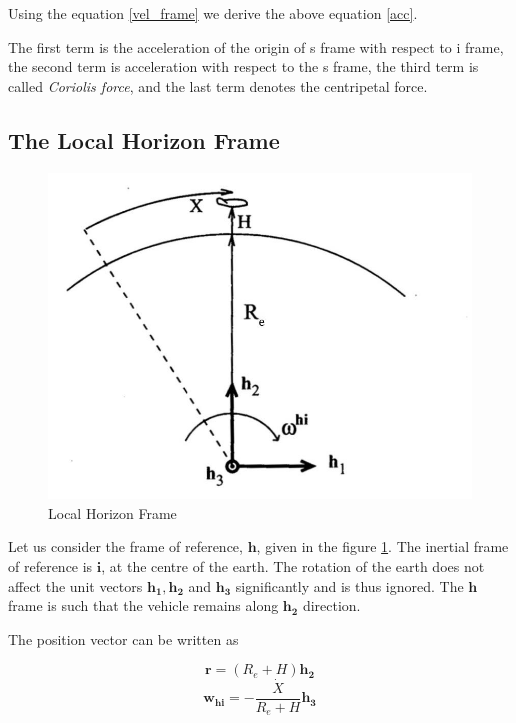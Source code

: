 \documentclass{article}
\theoremstyle{definition}
\begin{document}
Using the equation \ref{vel_frame} we derive the above equation \ref{acc}.

The first term is the acceleration of the origin of s frame with respect to i frame, the second term is acceleration with respect to the s frame, the third term is called \emph{Coriolis force}, and the last term denotes the centripetal force.

\subsection{The Local Horizon Frame}
\begin{figure}[h]
    \centering
    \includegraphics[scale=0.2]{image 1.jpeg}
    \caption{Local Horizon Frame}
    \label{fig:LHF}
\end{figure}


Let us consider the frame of reference, $\boldsymbol h$, given in the figure \ref{fig:LHF}. The inertial frame of reference is $\boldsymbol i$, at the centre of the earth. The rotation of the earth does not affect the unit vectors $\boldsymbol{h_1, h_2}$ and $\boldsymbol{h_3}$ significantly and is thus ignored. The $\boldsymbol h$ frame is such that the vehicle remains along $\boldsymbol{h_2}$ direction.

The position vector can be written as

\begin{equation}\label{pos_vec}
    \boldsymbol{r} = (R_e + H)\boldsymbol{h_2}
\end{equation}
\begin{equation}\label{omega}
    \boldsymbol{w_{hi}}= -\frac{\Dot{X}}{R_e + H}\boldsymbol{h_3}
\end{equation}
\end{document}
